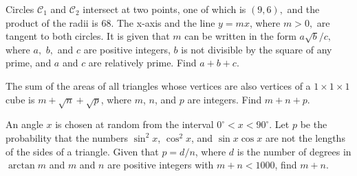 %	







\begin{question}[name={2002 AIME II, \href{https://artofproblemsolving.com/community/c4p714643}{Problem 15}}]
	Circles $\mathcal{C}_{1}$ and $\mathcal{C}_{2}$ intersect at two points, one of which is $(9,6),$ and the product of the radii is $68.$ The x-axis and the line $y=mx$, where $m>0,$ are tangent to both circles. It is given that $m$ can be written in the form $a\sqrt{b}/c,$ where $a,$ $b,$ and $c$ are positive integers, $b$ is not divisible by the square of any prime, and $a$ and $c$ are relatively prime. Find $a+b+c$.	
\end{question}


%	









\begin{question}[name={2003 AIME I, \href{https://artofproblemsolving.com/community/c4p509046}{Problem 6}}]
	The sum of the areas of all triangles whose vertices are also vertices of a $1\times 1 \times 1$ cube is $m+\sqrt{n}+\sqrt{p}$, where $m$, $n$, and $p$ are integers. Find $m+n+p$.
\end{question}


%	













\begin{question}[name={2003 AIME I, \href{https://artofproblemsolving.com/community/c4p509430}{Problem 11}}]
	An angle $x$ is chosen at random from the interval $0^\circ < x < 90^\circ$. Let $p$ be the probability that the numbers $\sin^2 x$, $\cos^2 x$, and $\sin x \cos x$ are not the lengths of the sides of a triangle. Given that $p = d/n$, where $d$ is the number of degrees in $\arctan m$ and $m$ and $n$ are positive integers with $m + n < 1000$, find $m + n$.	
\end{question}


